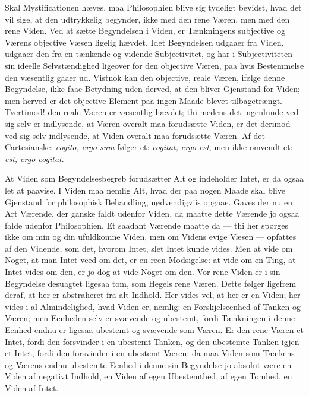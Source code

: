 \documentclass[11pt]{book}
\newcommand{\opage}[1]{\marginnote{\footnotesize\textit{[#1]}}}
\begin{document}
Skal Mystificationen hæves, maa Philosophien blive sig tydeligt
bevidst, hvad det vil sige, at den udtrykkelig begynder, ikke med den
rene Væren, men med den rene Viden. Ved at sætte Begyndelsen i Viden,
er Tænkningens subjective og Værens objective Væsen ligelig hævdet.
Idet Begyndelsen udgaaer fra Viden, udgaaer den fra en tænkende og
vidende Subjectivitet, og har i Subjectiviteten sin ideelle
Selvstændighed ligeover for den objective Væren, paa hvis Bestemmelse
den væsentlig gaaer ud. Vistnok kan den objective, reale Væren, ifølge
denne Begyndelse, ikke faae Betydning uden derved, at den bliver
Gjenstand for Viden; men herved er det objective Element paa ingen
Maade blevet tilbagetrængt. Tvertimod! den reale Væren er væsentlig
hævdet; thi medens det ingenlunde ved sig selv er indlysende, at Væren
overalt maa forudsætte Viden, er det derimod ved sig selv indlysende,
at Viden overalt maa forudsætte Væren. Af det Cartesianske:
\textit{cogito, ergo sum} følger et: \textit{cogitat, ergo est}, men
ikke omvendt et: \textit{est, ergo cogitat}.

At Viden som Begyndelsesbegreb forudsætter Alt og indeholder Intet, er
da ogsaa let at paavise. I Viden maa nemlig Alt, hvad der paa nogen
Maade skal blive Gjenstand for philosophisk Behandling, nødvendigviis
opgaae. Gaves der nu en Art Værende, der ganske faldt udenfor Viden,
da maatte dette Værende jo ogsaa falde udenfor Philosophien. Et
saadant Værende maatte da --- thi her spørges ikke om min og din
ufuldkomne Viden, men om Videns evige Væsen --- opfattes af den
Vidende, som det, hvorom Intet, slet Intet kunde vides. Men at vide om
Noget, at man Intet veed
\opage{5} \setcounter{footnote}{0}%
om det, er en reen Modsigelse: at vide om en Ting, at Intet vides om
den, er jo dog at vide Noget om den. Vor rene Viden er i sin
Begyndelse desuagtet ligesaa tom, som Hegels rene Væren. Dette følger
ligefrem deraf, at her er abstraheret fra alt Indhold. Her vides vel,
at her er en Viden; her vides i al Almindelighed, hvad Viden er,
nemlig: en Forskjelseenhed af Tanken og Væren; men Eenheden selv er
svævende og ubestemt, fordi Tænkningen i denne Eenhed endnu er ligesaa
ubestemt og svævende som Væren. Er den rene Væren et Intet, fordi den
forsvinder i en ubestemt Tanken, og den ubestemte Tanken igjen et
Intet, fordi den forsvinder i en ubestemt Væren: da maa Viden som
Tænkens og Værens endnu ubestemte Eenhed i denne sin Begyndelse jo
absolut være en Viden af negativt Indhold, en Viden af egen
Ubestemthed, af egen Tomhed, en Viden af Intet.
\end{document}
